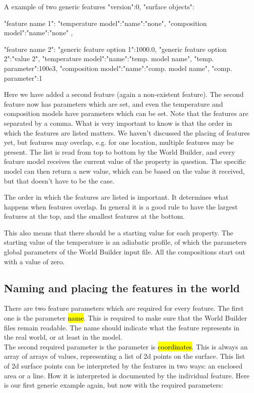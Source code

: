 \documentclass{book}
\newcommand{\WB}{{World Builder}}
\begin{document}
\begin{bashcode}{A example of two generic features}
"version":0,
"surface objects":
{
  "feature name 1":
  {
    "temperature model":{"name":"none"},
    "composition model":{"name":"none"}
  },
                     
  "feature name 2":
  {
    "generic feature option 1":1000.0, 
    "generic feature option 2":"value 2",
    "temperature model":{"name":"temp. model name", "temp. parameter":100e3},
    "composition model":{"name":"comp. model name", "comp. parameter":1}
  }
}
\end{bashcode}

Here we have added a second feature (again a non-existent feature). The second feature now has parameters which are set, and even the temperature and composition models have parameters which can be set. Note that the features are separated by a comma. What is very important to know is that the order in which the features are listed matters. We haven't discussed the placing of features yet, but features may overlap, e.g. for one location, multiple features may be present. The list is read from top to bottom by the \WB{}, and every feature model receives the current value of the property in question. The specific model can then return a new value, which can be based on the value it received, but that doesn't have to be the case. 

\begin{remark}
The order in which the features are listed is important. It determines what happens when features overlap. In general it is a good rule to have the largest features at the top, and the smallest features at the bottom.
\end{remark}

This also means that there should be a starting value for each property. The starting value of the temperature is an adiabatic profile, of which the parameters global parameters of the \WB{} input file. All the compositions start out with a value of zero.

\subsection{Naming and placing the features in the world}
There are two feature parameters which are required for every feature. The first one is the parameter \hl{name}. This is required to make sure that the \WB{} files remain readable. The name should indicate what the feature represents in the real world, or at least in the model. 
\\
The second required parameter is the parameter is \hl{coordinates}. This is always an array of arrays of values, representing a list of 2d points on the surface. This list of 2d surface points can be interpreted by the features in two ways: an enclosed area or a line. How it is interpreted is documented by the individual feature. Here is our first generic example again, but now with the required parameters:
\end{document}

